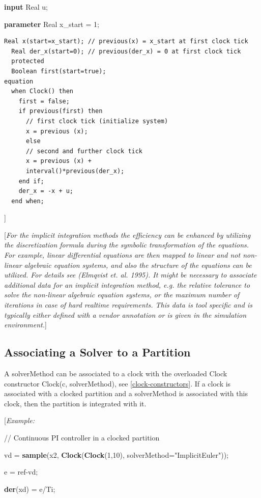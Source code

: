 \documentclass[10pt,a4paper]{report}
\def\doublelabel#1{\label{#1}\hypertarget{#1}{}}
\begin{document}
\textbf{input} Real u;

\textbf{parameter} Real x\_start = 1;

\begin{lstlisting}[language=modelica]
  Real x(start=x_start); // previous(x) = x_start at first clock tick
  Real der_x(start=0); // previous(der_x) = 0 at first clock tick
  protected 
  Boolean first(start=true);
equation 
  when Clock() then
    first = false;
    if previous(first) then
      // first clock tick (initialize system)
      x = previous (x);
      else
      // second and further clock tick
      x = previous (x) +
      interval()*previous(der_x);
    end if;
    der_x = -x + u;
  end when;
\end{lstlisting}
{]}

{[}\emph{For the implicit integration methods the efficiency can be
enhanced by utilizing the discretization formula during the symbolic
transformation of the equations. For example, linear differential
equations are then mapped to linear and not non-linear algebraic
equation systems, and also the structure of the equations can be
utilized. For details see (Elmqvist et. al. 1995). It might be necessary
to associate additional data for an implicit integration method, e.g.
the relative tolerance to solve the non-linear algebraic equation
systems, or the maximum number of iterations in case of hard realtime
requirements. This data is tool specific and is typically either defined
with a vendor annotation or is given in the simulation environment.}{]}

\subsection{Associating a Solver to a Partition}\doublelabel{associating-a-solver-to-a-partition}

A solverMethod can be associated to a clock with the overloaded Clock
constructor Clock(c, solverMethod), see \ref{clock-constructors}. If a clock is
associated with a clocked partition and a solverMethod is associated
with this clock, then the partition is integrated with it.

{[}\emph{Example:}

// Continuous PI controller in a clocked partition

vd = \textbf{sample}(x2, \textbf{Clock}(\textbf{Clock}(1,10),
solverMethod="ImplicitEuler"));

e = ref-vd;

\textbf{der}(xd) = e/Ti;
\end{document}
